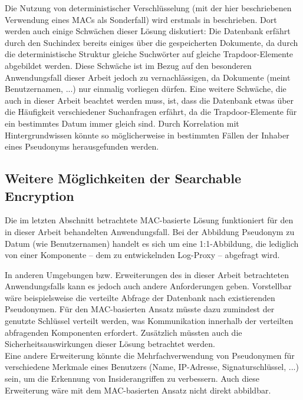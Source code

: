 Die Nutzung von deterministischer Verschlüsselung (mit der hier beschriebenen Verwendung eines MACs als Sonderfall) wird erstmals in \cite{bellare2007deterministic} beschrieben. Dort werden auch einige Schwächen dieser Lösung diskutiert: Die Datenbank erfährt durch den Suchindex bereits einiges über die gespeicherten Dokumente, da durch die deterministische Struktur gleiche Suchwörter auf gleiche Trapdoor-Elemente abgebildet werden. Diese Schwäche ist im Bezug auf den besonderen Anwendungsfall dieser Arbeit jedoch zu vernachlässigen, da Dokumente (meint Benutzernamen, ...) nur einmalig vorliegen dürfen. Eine weitere Schwäche, die auch in dieser Arbeit beachtet werden muss, ist, dass die Datenbank etwas über die Häufigkeit verschiedener Suchanfragen erfährt, da die Trapdoor-Elemente für ein bestimmtes Datum immer gleich sind. Durch Korrelation mit Hintergrundwissen könnte so möglicherweise in bestimmten Fällen der Inhaber eines Pseudonyms herausgefunden werden. 

\subsection{Weitere Möglichkeiten der Searchable Encryption}
\label{sec_state_se_furtherpossibilities}


Die im letzten Abschnitt betrachtete MAC-basierte Lösung funktioniert für den in dieser Arbeit behandelten Anwendungsfall. Bei der Abbildung Pseudonym zu Datum (wie Benutzernamen) handelt es sich um eine 1:1-Abbildung, die lediglich von einer Komponente -- dem zu entwickelnden Log-Proxy -- abgefragt wird. 

In anderen Umgebungen bzw. Erweiterungen des in dieser Arbeit betrachteten Anwendungsfalls kann es jedoch auch andere Anforderungen geben. Vorstellbar wäre beispielsweise die verteilte Abfrage der Datenbank nach existierenden Pseudonymen. Für den MAC-basierten Ansatz müsste dazu zumindest der genutzte Schlüssel verteilt werden, was Kommunikation innerhalb der verteilten abfragenden Komponenten erfordert. Zusätzlich müssten auch die Sicherheitsauswirkungen dieser Lösung betrachtet werden.\\
Eine andere Erweiterung könnte die Mehrfachverwendung von Pseudonymen für verschiedene Merkmale eines Benutzers (Name, IP-Adresse, Signaturschlüssel, ...) sein, um die Erkennung von Insiderangriffen zu verbessern. Auch diese Erweiterung wäre mit dem MAC-basierten Ansatz nicht direkt abbildbar.


